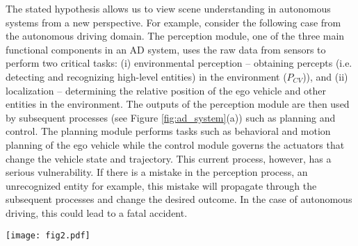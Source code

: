 \documentclass[conference]{IEEEtran}
\begin{document}
The stated hypothesis allows us to view scene understanding in autonomous systems from a new perspective. For example, consider the following case from the autonomous driving domain. The perception module, one of the three main functional components in an AD system, uses the raw data from sensors to perform two critical tasks: (i) environmental perception -- obtaining percepts (i.e. detecting and recognizing high-level entities) in the environment ($P_{CV}$)), and (ii) localization -- determining the relative position of the ego vehicle and other entities in the environment. The outputs of the perception module are then used by subsequent processes (see Figure \ref{fig:ad_system}(a)) such as planning and control. The planning module performs tasks such as behavioral and motion planning of the ego vehicle while the control module governs the actuators that change the vehicle state and trajectory. This current process, however, has a serious vulnerability. If there is a mistake in the perception process, an unrecognized entity for example, this mistake will propagate through the subsequent processes and change the desired outcome. In the case of autonomous driving, this could lead to a fatal accident. \\

\begin{figure*}[ht]
    \centering
    \texttt{[image: fig2.pdf]}
    \caption{Improved machine perception through KEP in Autonomous Driving }
    \label{fig:ad_system}
\end{figure*}
\end{document}
